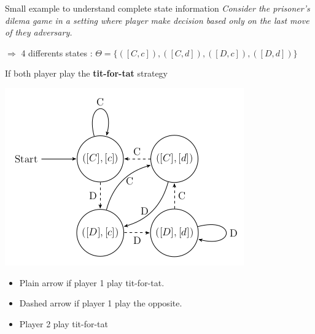 \begin{frame}{Small example to understand complete state information}
\textit{Consider the prisoner's dilema game in a setting where player make decision based only on the last move of they adversary.} 

\pause
$\Rightarrow$ 4 differents states : $\Theta = \{([C,c]), ([C,d]), ([D,c]), ([D,d])\}$

\pause
If both player play the \textbf{tit-for-tat} strategy

\begin{minipage}{0.6\linewidth}
\includegraphics[width=0.9\linewidth]{img/titfortat.png}
\end{minipage}
\begin{minipage}{0.35\linewidth}
	\begin{itemize}
		\item Plain arrow if player 1 play tit-for-tat.
		\item Dashed arrow if player 1 play the opposite.
		\item Player 2 play tit-for-tat
	\end{itemize}
\end{minipage}

\end{frame}


